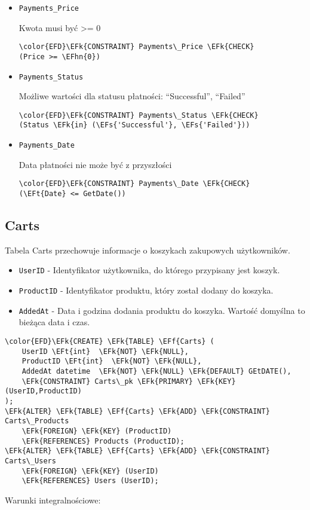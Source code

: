 \documentclass[11pt]{article}
\newcommand{\EFs}[1]{\textcolor{EFs}{#1}} %
\newcommand{\EFk}[1]{\textcolor{EFk}{\textbf{#1}}} %
\newcommand{\EFf}[1]{\textcolor{EFf}{#1}} %
\newcommand{\EFt}[1]{\textcolor{EFt}{\textbf{#1}}} %
\newcommand{\EFhn}[1]{\textcolor{EFhn}{#1}} %
\begin{document}
\begin{itemize}
\item \texttt{Payments\_Price}

Kwota musi być  >= 0
\begin{Code}
\begin{Verbatim}
\color{EFD}\EFk{CONSTRAINT} Payments\_Price \EFk{CHECK}
(Price >= \EFhn{0})
\end{Verbatim}
\end{Code}
\item \texttt{Payments\_Status}

Możliwe wartości dla statusu płatności: ``Successful'', ``Failed''
\begin{Code}
\begin{Verbatim}
\color{EFD}\EFk{CONSTRAINT} Payments\_Status \EFk{CHECK}
(Status \EFk{in} (\EFs{'Successful'}, \EFs{'Failed'}))
\end{Verbatim}
\end{Code}
\item \texttt{Payments\_Date}

Data płatności nie może być z przyszłości
\begin{Code}
\begin{Verbatim}
\color{EFD}\EFk{CONSTRAINT} Payments\_Date \EFk{CHECK}
(\EFt{Date} <= GetDate())
\end{Verbatim}
\end{Code}
\end{itemize}
\subsection{Carts}
\label{sec:org8285fe2}
Tabela Carts przechowuje informacje o koszykach zakupowych użytkowników.
\begin{itemize}
\item \texttt{UserID} - Identyfikator użytkownika, do którego przypisany jest koszyk.
\item \texttt{ProductID} - Identyfikator produktu, który został dodany do koszyka.
\item \texttt{AddedAt} - Data i godzina dodania produktu do koszyka. Wartość domyślna to bieżąca data i czas.
\end{itemize}
\begin{Code}
\begin{Verbatim}
\color{EFD}\EFk{CREATE} \EFk{TABLE} \EFf{Carts} (
    UserID \EFt{int}  \EFk{NOT} \EFk{NULL},
    ProductID \EFt{int}  \EFk{NOT} \EFk{NULL},
    AddedAt datetime  \EFk{NOT} \EFk{NULL} \EFk{DEFAULT} GEtDATE(),
    \EFk{CONSTRAINT} Carts\_pk \EFk{PRIMARY} \EFk{KEY}  (UserID,ProductID)
);
\EFk{ALTER} \EFk{TABLE} \EFf{Carts} \EFk{ADD} \EFk{CONSTRAINT} Carts\_Products
    \EFk{FOREIGN} \EFk{KEY} (ProductID)
    \EFk{REFERENCES} Products (ProductID);
\EFk{ALTER} \EFk{TABLE} \EFf{Carts} \EFk{ADD} \EFk{CONSTRAINT} Carts\_Users
    \EFk{FOREIGN} \EFk{KEY} (UserID)
    \EFk{REFERENCES} Users (UserID);
\end{Verbatim}
\end{Code}
Warunki integralnościowe:
\end{document}
